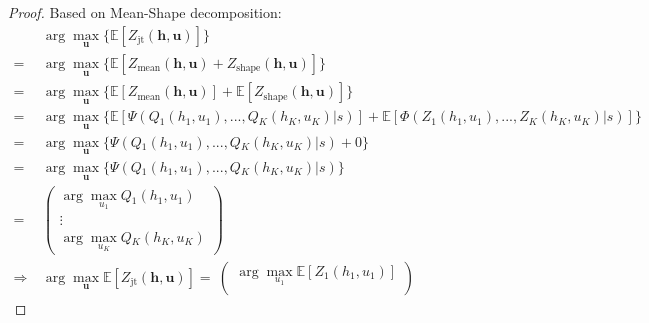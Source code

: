 \documentclass[twoside,11pt]{article}
\newcommand{\state}{s}
\newcommand{\jointaction}{\mathbf{u}}
\newcommand{\action}{u}
\newcommand{\jointobservationhistory}{\mathbf{h}}
\newcommand{\observationhistory}{h}
\newcommand{\numberofagents}{K}
\newcommand{\utilityexp}{Q}
\newcommand{\utility}{Z}
\newcommand{\joint}{\mathrm{jt}}
\newcommand{\meandecompositionfunction}{\Psi}
\newcommand{\shapedecompositionfunction}{\Phi}
\begin{document}
\begin{proof}
Based on Mean-Shape decomposition:
\begin{equation}
\begin{aligned}
&\arg\max_\jointaction{}\{ \mathbb{E}[\utility{}_{\joint{}}(\jointobservationhistory{},\jointaction{})]\}\\
=\ &\arg\max_\jointaction{}\{ \mathbb{E}[\utility{}_{\mathrm{mean}}(\jointobservationhistory{},\jointaction{})+\utility{}_{\mathrm{shape}}(\jointobservationhistory{},\jointaction{})]\}\\
=\ &\arg\max_\jointaction{} \{\mathbb{E}[\utility{}_{\mathrm{mean}}(\jointobservationhistory{},\jointaction{})]+\mathbb{E}[\utility{}_{\mathrm{shape}}(\jointobservationhistory{},\jointaction{})]\}\\
=\ &\arg\max_\jointaction{} \{\mathbb{E}[\meandecompositionfunction(\utilityexp{}_1(\observationhistory{}_1,\action{}_1), ..., \utilityexp{}_{\numberofagents{}}(\observationhistory{}_{\numberofagents{}},\action{}_{\numberofagents{}})\vert\state)]+\mathbb{E}[\shapedecompositionfunction(\utility{}_1(\observationhistory{}_1,\action{}_1), ..., \utility{}_{\numberofagents{}}(\observationhistory{}_{\numberofagents{}},\action{}_{\numberofagents{}})\vert\state)]\}\\
=\ &\arg\max_\jointaction{} \{\meandecompositionfunction(\utilityexp{}_1(\observationhistory{}_1,\action{}_1), ..., \utilityexp{}_{\numberofagents{}}(\observationhistory{}_{\numberofagents{}},\action{}_{\numberofagents{}})\vert\state)+0\}\\
=\ &\arg\max_\jointaction{} \{\meandecompositionfunction(\utilityexp{}_1(\observationhistory{}_1,\action{}_1), ..., \utilityexp{}_{\numberofagents{}}(\observationhistory{}_{\numberofagents{}},\action{}_{\numberofagents{}})\vert\state)\}\\
=\ &\begin{pmatrix}
\arg\max_{\action{}_1} \utilityexp{}_1(\observationhistory{}_1,\action{}_1)\\
\vdots \\
\arg\max_{\action{}_\numberofagents{}} \utilityexp{}_\numberofagents{}(\observationhistory{}_\numberofagents{},\action{}_\numberofagents{})
\end{pmatrix}\\
\Rightarrow\ &\arg\max_\jointaction{} \mathbb{E}[\utility{}_{\joint{}}(\jointobservationhistory{},\jointaction{})]
=\ \begin{pmatrix}
\arg\max_{\action{}_1} \mathbb{E}[\utility{}_1(\observationhistory{}_1,\action{}_1)]\\

\end{pmatrix}
\end{aligned}
\end{equation}
\end{proof}
\end{document}
